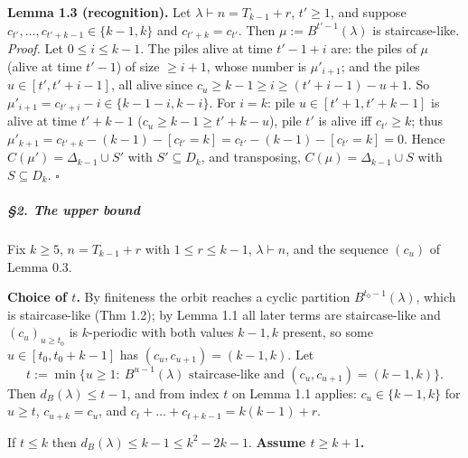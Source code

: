 \textbf{Lemma 1.3 (recognition).} Let \(\lambda\vdash n=T_{k-1}+r\),
\(t'\ge1\), and suppose \(c_{t'},\dots,c_{t'+k-1}\in\{k-1,k\}\) and
\(c_{t'+k}=c_{t'}\). Then \(\mu:=B^{t'-1}(\lambda)\) is staircase-like.
\emph{Proof.} Let \(0\le i\le k-1\). The piles alive at time \(t'-1+i\)
are: the piles of \(\mu\) (alive at time \(t'-1\)) of size \(\ge i+1\),
whose number is \(\mu'_{i+1}\); and the piles \(u\in[t',t'+i-1]\), all
alive since \(c_u\ge k-1\ge i\ge (t'+i-1)-u+1\). So
\(\mu'_{i+1}=c_{t'+i}-i\in\{k-1-i,k-i\}\). For \(i=k\): pile
\(u\in[t'+1,t'+k-1]\) is alive at time \(t'+k-1\)
(\(c_u\ge k-1\ge t'+k-u\)), pile \(t'\) is alive iff \(c_{t'}\ge k\);
thus \(\mu'_{k+1}=c_{t'+k}-(k-1)-[c_{t'}=k]=c_{t'}-(k-1)-[c_{t'}=k]=0\).
Hence \(C(\mu')=\Delta_{k-1}\cup S'\) with \(S'\subseteq D_k\), and
transposing, \(C(\mu)=\Delta_{k-1}\cup S\) with \(S\subseteq D_k\).
\(\square\)

\subparagraph{§2. The upper bound}\label{the-upper-bound}

Fix \(k\ge5\), \(n=T_{k-1}+r\) with \(1\le r\le k-1\),
\(\lambda\vdash n\), and the sequence \((c_u)\) of Lemma 0.3.

\textbf{Choice of \(t\).} By finiteness the orbit reaches a cyclic
partition \(B^{t_0-1}(\lambda)\), which is staircase-like (Thm 1.2); by
Lemma 1.1 all later terms are staircase-like and \((c_u)_{u\ge t_0}\) is
\(k\)-periodic with both values \(k-1,k\) present, so some
\(u\in[t_0,t_0+k-1]\) has \((c_u,c_{u+1})=(k-1,k)\). Let
\[t:=\min\{u\ge1:\ B^{u-1}(\lambda)\text{ staircase-like and }(c_u,c_{u+1})=(k-1,k)\}.\]
Then \(d_B(\lambda)\le t-1\), and from index \(t\) on Lemma 1.1 applies:
\(c_{u}\in\{k-1,k\}\) for \(u\ge t\), \(c_{u+k}=c_u\), and
\(c_t+\dots+c_{t+k-1}=k(k-1)+r\).

If \(t\le k\) then \(d_B(\lambda)\le k-1\le k^2-2k-1\). \textbf{Assume
\(t\ge k+1\).}

